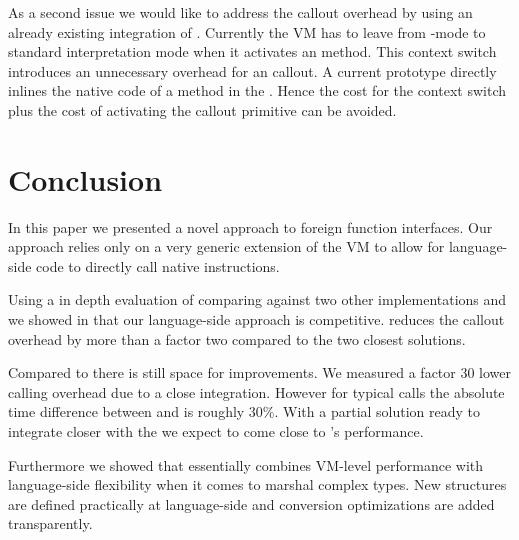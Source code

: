 As a second issue we would like to address the callout overhead by using an already existing \JIT integration of \NB.
Currently the VM has to leave from \JIT-mode to standard interpretation mode when it activates an \NB method.
This context switch introduces an unnecessary overhead for an \FFI callout.
A current prototype directly inlines the native code of a \NB method in the \JIT.
Hence the cost for the context switch plus the cost of activating the \NB callout primitive can be avoided.



\section{Conclusion}
In this paper we presented \NB a novel approach to foreign function interfaces.
Our approach relies only on a very generic extension of the VM to allow for language-side code to directly call native instructions.

Using a in depth evaluation of \NB comparing against two other \ST \FFI implementations and \LuaJIT we showed in  that our language-side approach is competitive.
\NB reduces the callout overhead by more than a factor two compared to the two closest \ST solutions.

Compared to \LuaJIT there is still space for improvements.
We measured a factor 30 lower calling overhead due to a close \JIT integration.
However for typical \FFI calls the absolute time difference between \NB and \Lua is roughly $30\%$.
With a partial solution ready to integrate \NB closer with the \JIT we expect to come close to \Lua's performance.

Furthermore we showed that \NB essentially combines VM-level performance with language-side flexibility when it comes to marshal complex types.
New structures are defined practically at language-side and conversion optimizations are added transparently.


